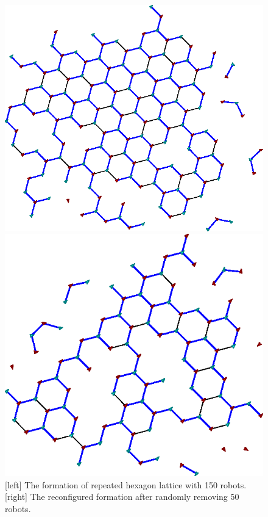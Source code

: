 \begin{figure}
    \begin{minipage}[b]{0.5\linewidth}
        \includegraphics[width=.95\columnwidth]{figs/formation-150}
    \end{minipage}
    \begin{minipage}[b]{0.45\linewidth}
        \includegraphics[width=.95\columnwidth]{figs/formation-100}
    \end{minipage}
    \caption{[left] The formation of repeated hexagon lattice with 150 robots. [right] The reconfigured formation after randomly removing 50 robots.}
\label{fig:robust}
\end{figure}

